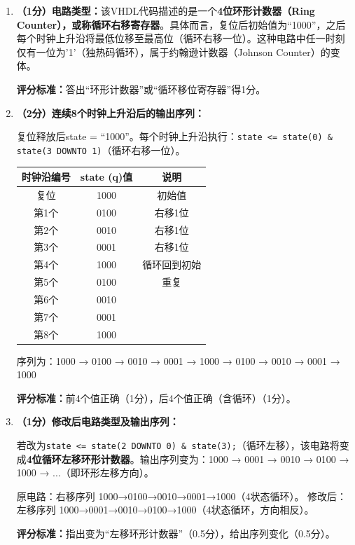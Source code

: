 \begin{enumerate}[label=(\arabic*), leftmargin=*]

\item \textbf{（1分）电路类型：}该VHDL代码描述的是一个\textbf{4位环形计数器（Ring Counter），或称循环右移寄存器}。具体而言，复位后初始值为“1000”，之后每个时钟上升沿将最低位移至最高位（循环右移一位）。这种电路中任一时刻仅有一位为'1'（独热码循环），属于约翰逊计数器（Johnson Counter）的变体。

\textbf{评分标准：}答出“环形计数器”或“循环移位寄存器”得1分。

\item \textbf{（2分）连续8个时钟上升沿后的输出序列：}

复位释放后state = “1000”。每个时钟上升沿执行：\texttt{state <= state(0) \& state(3 DOWNTO 1)}（循环右移一位）。

\begin{center}
\begin{tabular}{|c|c|c|}
\hline
\textbf{时钟沿编号} & \textbf{state (q)值} & \textbf{说明} \\
\hline
复位 & 1000 & 初始值 \\
第1个 & 0100 & 右移1位 \\
第2个 & 0010 & 右移1位 \\
第3个 & 0001 & 右移1位 \\
第4个 & 1000 & 循环回到初始 \\
第5个 & 0100 & 重复 \\
第6个 & 0010 &  \\
第7个 & 0001 &  \\
第8个 & 1000 &  \\
\hline
\end{tabular}
\end{center}

序列为：1000 → 0100 → 0010 → 0001 → 1000 → 0100 → 0010 → 0001 → 1000

\textbf{评分标准：}前4个值正确（1分），后4个值正确（含循环）（1分）。

\item \textbf{（1分）修改后电路类型及输出序列：}

若改为\texttt{state <= state(2 DOWNTO 0) \& state(3);}（循环左移），该电路将变成\textbf{4位循环左移环形计数器}。输出序列变为：1000 → 0001 → 0010 → 0100 → 1000 → ...（即环形左移方向）。

原电路：右移序列 1000→0100→0010→0001→1000（4状态循环）。
修改后：左移序列 1000→0001→0010→0100→1000（4状态循环，方向相反）。

\textbf{评分标准：}指出变为“左移环形计数器”（0.5分），给出序列变化（0.5分）。


\end{enumerate}
